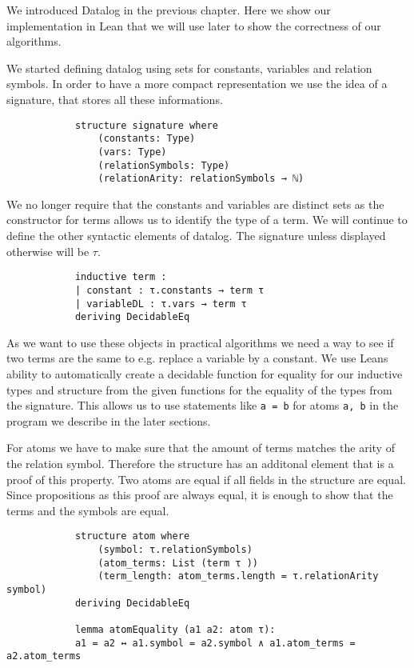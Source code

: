 \documentclass{article}
\begin{document}
        We introduced Datalog in the previous chapter. Here we show our implementation in Lean that we will use later to show the correctness of our algorithms.

        We started defining datalog using sets for constants, variables and relation symbols. In order to have a more compact representation we use the idea of a signature, that stores all these informations.

        \begin{lstlisting}
            structure signature where
                (constants: Type)
                (vars: Type)
                (relationSymbols: Type)
                (relationArity: relationSymbols → ℕ)
        \end{lstlisting}

        We no longer require that the constants and variables are distinct sets as the constructor for terms allows us to identify the type of a term. We will continue to define the other syntactic elements of datalog. The signature unless displayed otherwise will be $\tau$.

        \begin{lstlisting}
            inductive term :
            | constant : τ.constants → term τ
            | variableDL : τ.vars → term τ
            deriving DecidableEq
        \end{lstlisting}

        As we want to use these objects in practical algorithms we need a way to see if two terms are the same to e.g. replace a variable by a constant. We use Leans ability to automatically create a decidable function for equality for our inductive types and structure from the given functions for the equality of the types from the signature. This allows us to use statements like \texttt{a = b} for atoms \texttt{a, b} in the program we describe in the later sections.
    
        For atoms we have to make sure that the amount of terms matches the arity of the relation symbol. Therefore the structure has an additonal element that is a proof of this property. Two atoms are equal if all fields in the structure are equal. Since propositions as this proof are always equal, it is enough to show that the terms and the symbols are equal.

        \begin{lstlisting}
            structure atom where
                (symbol: τ.relationSymbols)
                (atom_terms: List (term τ ))
                (term_length: atom_terms.length = τ.relationArity symbol)
            deriving DecidableEq

            lemma atomEquality (a1 a2: atom τ): 
            a1 = a2 ↔ a1.symbol = a2.symbol ∧ a1.atom_terms = a2.atom_terms 

        \end{lstlisting}
\end{document}
